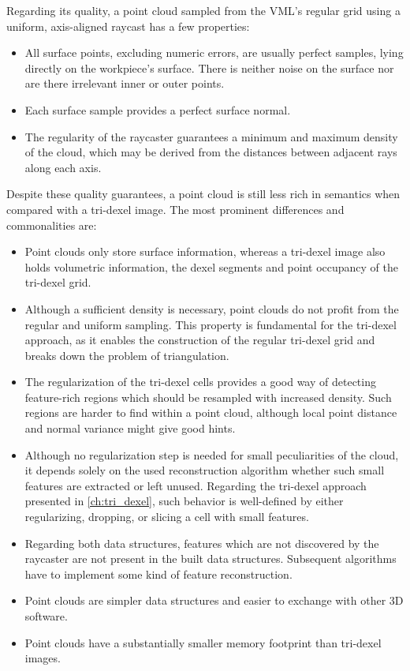 Regarding its quality, a point cloud sampled from the VML's regular grid using a uniform, axis-aligned raycast has a few properties:
\begin{itemize}
	\item
	All surface points, excluding numeric errors, are usually perfect samples, lying directly on the workpiece's surface.
	There is neither noise on the surface nor are there irrelevant inner or outer points.
	\item
	Each surface sample provides a perfect surface normal.
	\item
	The regularity of the raycaster guarantees a minimum and maximum density of the cloud, which may be derived from the distances between adjacent rays along each axis.
\end{itemize}

Despite these quality guarantees, a point cloud is still less rich in semantics when compared with a tri-dexel image.
The most prominent differences and commonalities are:
\begin{itemize}
	\item
	Point clouds only store surface information, whereas a tri-dexel image also holds volumetric information, \ie the dexel segments and point occupancy of the tri-dexel grid.
	\item
	Although a sufficient density is necessary, point clouds do not profit from the regular and uniform sampling.
	This property is fundamental for the tri-dexel approach, as it enables the construction of the regular tri-dexel grid and breaks down the problem of triangulation.
	\item
	The regularization of the tri-dexel cells provides a good way of detecting feature-rich regions which should be resampled with increased density.
	Such regions are harder to find within a point cloud, although local point distance and normal variance might give good hints.
	\item
	Although no regularization step is needed for small peculiarities of the cloud, it depends solely on the used reconstruction algorithm whether such small features are extracted or left unused.
	Regarding the tri-dexel approach presented in \cref{ch:tri_dexel}, such behavior is well-defined by either regularizing, \ie dropping, or slicing a cell with small features.
	\item
	Regarding both data structures, features which are not discovered by the raycaster are not present in the built data structures.
	Subsequent algorithms have to implement some kind of feature reconstruction.
	\item
	Point clouds are simpler data structures and easier to exchange with other 3D software.
	\item
	Point clouds have a substantially smaller memory footprint than tri-dexel images.
\end{itemize}


